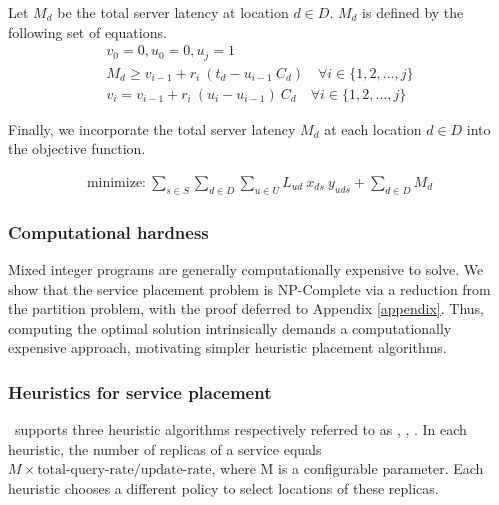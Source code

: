 Let $M_d$ be the total server latency at location $d \in D$. $M_d$ is defined  by the following set of equations.
\begin{eqnarray}
v_0 = 0, u_0 = 0, u_j = 1\\
M_d \geq v_{i - 1} + r_i\ (t_d - u_{i -1} \ C_d) \quad \forall i \in \{1, 2, ..., j\}  \\
v_i = v_{i - 1} + r_i\ (u_i - u_{i - 1})\ C_d \quad \forall i \in \{1, 2, ..., j\} 
\end{eqnarray}

Finally, we incorporate the total server latency $M_d$ at each location $d\in D$ into the objective function.


\begin{eqnarray}
\text{minimize:}\  \sum_{s \in S} \sum_{d \in D} \sum_{u \in U} L_{ud} \ x_{ds} \ y_{uds}  + \sum_{d \in D} M_d
\end{eqnarray}


\subsubsection{Computational hardness}

Mixed integer programs are generally computationally expensive to solve. We show that the service placement problem is NP-Complete via a reduction from the partition problem, with the proof deferred to Appendix \ref{appendix}. Thus, computing the optimal solution intrinsically demands a computationally expensive approach, motivating simpler heuristic placement algorithms.



\subsubsection{Heuristics for service placement}


\auspice\ supports three heuristic algorithms respectively referred to as \uniform, \kmedoids, \locaware. In each heuristic, the number of  replicas of a service equals  $M \times \text{total-query-rate}/\text{update-rate}$, where M is a configurable parameter. Each heuristic chooses a different policy to select locations of these replicas. 

